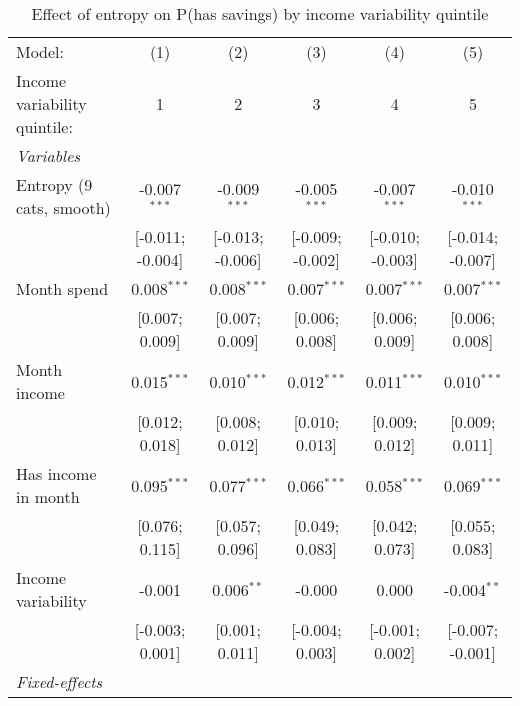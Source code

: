 
\begin{table}[htbp]
   \centering
   \tiny
   \begin{threeparttable}[b]
      \caption{\label{tab:reg_has_inflows_entropy_tag_sz_inc_var_quint} Effect of entropy on P(has savings) by income variability quintile}
      \begin{tabular}{lccccc}
         \tabularnewline \midrule \midrule
         Model:                       & (1)              & (2)              & (3)              & (4)              & (5)\\  
         Income variability quintile: & 1                & 2                & 3                & 4                & 5 \\   
         \midrule
         \emph{Variables}\\
         Entropy (9 cats, smooth)     & -0.007$^{***}$   & -0.009$^{***}$   & -0.005$^{***}$   & -0.007$^{***}$   & -0.010$^{***}$\\   
                                      & [-0.011; -0.004] & [-0.013; -0.006] & [-0.009; -0.002] & [-0.010; -0.003] & [-0.014; -0.007]\\   
         Month spend                  & 0.008$^{***}$    & 0.008$^{***}$    & 0.007$^{***}$    & 0.007$^{***}$    & 0.007$^{***}$\\   
                                      & [0.007; 0.009]   & [0.007; 0.009]   & [0.006; 0.008]   & [0.006; 0.009]   & [0.006; 0.008]\\   
         Month income                 & 0.015$^{***}$    & 0.010$^{***}$    & 0.012$^{***}$    & 0.011$^{***}$    & 0.010$^{***}$\\   
                                      & [0.012; 0.018]   & [0.008; 0.012]   & [0.010; 0.013]   & [0.009; 0.012]   & [0.009; 0.011]\\   
         Has income in month          & 0.095$^{***}$    & 0.077$^{***}$    & 0.066$^{***}$    & 0.058$^{***}$    & 0.069$^{***}$\\   
                                      & [0.076; 0.115]   & [0.057; 0.096]   & [0.049; 0.083]   & [0.042; 0.073]   & [0.055; 0.083]\\   
         Income variability           & -0.001           & 0.006$^{**}$     & -0.000           & 0.000            & -0.004$^{**}$\\   
                                      & [-0.003; 0.001]  & [0.001; 0.011]   & [-0.004; 0.003]  & [-0.001; 0.002]  & [-0.007; -0.001]\\   
         \midrule
         \emph{Fixed-effects}\\

\end{tabular}
\end{threeparttable}
\end{table}

